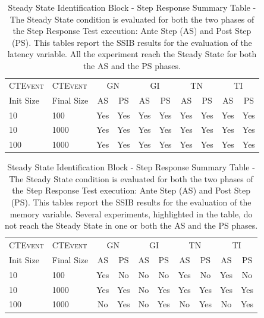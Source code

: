 \begin{table}[h]
\centering
\scriptsize
\begin{tabular}{ll|c|c|c|c|c|c|c|c}
\hline
\textsc{CTEvent}&\textsc{CTEvent}&\multicolumn{2}{c|}{GN}& \multicolumn{2}{c|}{GI}& \multicolumn{2}{c|}{TN}& \multicolumn{2}{c}{TI} \\
 Init Size & Final Size & AS& PS& AS& PS& AS& PS& AS & PS\\ 
\hline
\hline
10 & 100 & Yes& Yes & Yes & Yes & Yes& Yes & Yes & Yes \\ 
10 & 1000& Yes& Yes& Yes & Yes& Yes& Yes& Yes& Yes\\ 
100& 1000& Yes & Yes& Yes & Yes& Yes & Yes& Yes  & Yes\\ 
\hline
\end{tabular}
\caption[Steady State Identification Block - Step Response Summary Table - Latency]{Steady State Identification Block - Step Response Summary Table - The Steady State condition is evaluated for both the two phases of the Step Response Test execution: Ante Step (AS) and Post Step (PS). This tables report the SSIB results for the evaluation of the latency variable. All the experiment reach the Steady State for both the AS and the PS phases.}
\label{tab:ss-step-latency}
\end{table}


\begin{table}[h]
\centering
\scriptsize
\begin{tabular}{ll|c|c|c|c|c|c|c|c}
\hline
\textsc{CTEvent}&\textsc{CTEvent}&\multicolumn{2}{c|}{GN}& \multicolumn{2}{c|}{GI}& \multicolumn{2}{c|}{TN}& \multicolumn{2}{c}{TI} \\
 Init Size & Final Size & AS& PS& AS& PS& AS& PS& AS & PS\\ 
\hline
\hline
10 & 100 & Yes& \cellcolor[HTML]{C0C0C0}No & \cellcolor[HTML]{C0C0C0}No & \cellcolor[HTML]{C0C0C0}No & Yes& \cellcolor[HTML]{C0C0C0}No & \cellcolor[HTML]{FFFFFF}Yes & \cellcolor[HTML]{C0C0C0}No \\ 
10 & 1000& Yes& Yes& \cellcolor[HTML]{C0C0C0}No & Yes& Yes& Yes& Yes& Yes\\ 
100& 1000& \cellcolor[HTML]{C0C0C0}No & Yes& \cellcolor[HTML]{C0C0C0}No & Yes& \cellcolor[HTML]{C0C0C0}No & Yes& \cellcolor[HTML]{C0C0C0}No  & Yes\\ 
\hline
\end{tabular}
\caption[Steady State Identification Block - Step Response Summary Table - Memory]{Steady State Identification Block - Step Response Summary Table - The Steady State condition is evaluated for both the two phases of the Step Response Test execution: Ante Step (AS) and Post Step (PS). This tables report the SSIB results for the evaluation of the memory variable. Several experiments, highlighted in the table, do not reach the Steady State in one or both the AS and the PS phases.}
\label{tab:ss-step-memory}
\end{table}

